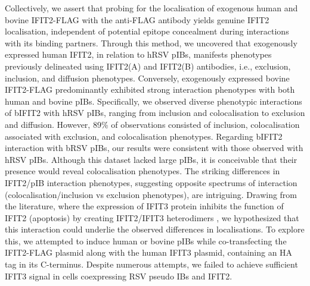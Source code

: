 Collectively, we assert that probing for the localisation of exogenous human and bovine IFIT2-FLAG with the anti-FLAG antibody yields genuine IFIT2 localisation, independent of potential epitope concealment during interactions with its binding partners. Through this method, we uncovered that exogenously expressed human IFIT2, in relation to hRSV pIBs, manifests phenotypes previously delineated using IFIT2(A) and IFIT2(B) antibodies, i.e., exclusion, inclusion, and diffusion phenotypes. Conversely, exogenously expressed bovine IFIT2-FLAG predominantly exhibited strong interaction phenotypes with both human and bovine pIBs. Specifically, we observed diverse phenotypic interactions of bIFIT2 with hRSV pIBs, ranging from inclusion and colocalisation to exclusion and diffusion. However, 89\% of observations consisted of inclusion, colocalisation associated with exclusion, and colocalisation phenotypes. Regarding bIFIT2 interaction with bRSV pIBs, our results were consistent with those observed with hRSV pIBs. Although this dataset lacked large pIBs, it is conceivable that their presence would reveal colocalisation phenotypes. The striking differences in IFIT2/pIB interaction phenotypes, suggesting opposite spectrums of interaction (colocalisation/inclusion vs exclusion phenotypes), are intriguing. Drawing from the literature, where the expression of IFIT3 protein inhibits the function of IFIT2 (apoptosis) by creating IFIT2/IFIT3 heterodimers \cite{Mears2018BetterResponse, Stawowczyk2011TheApoptosis}, we hypothesized that this interaction could underlie the observed differences in localisations. To explore this, we attempted to induce human or bovine pIBs while co-transfecting the IFIT2-FLAG plasmid along with the human IFIT3 plasmid, containing an HA tag in its C-terminus. Despite numerous attempts, we failed to achieve sufficient IFIT3 signal in cells coexpressing RSV pseudo IBs and IFIT2.


